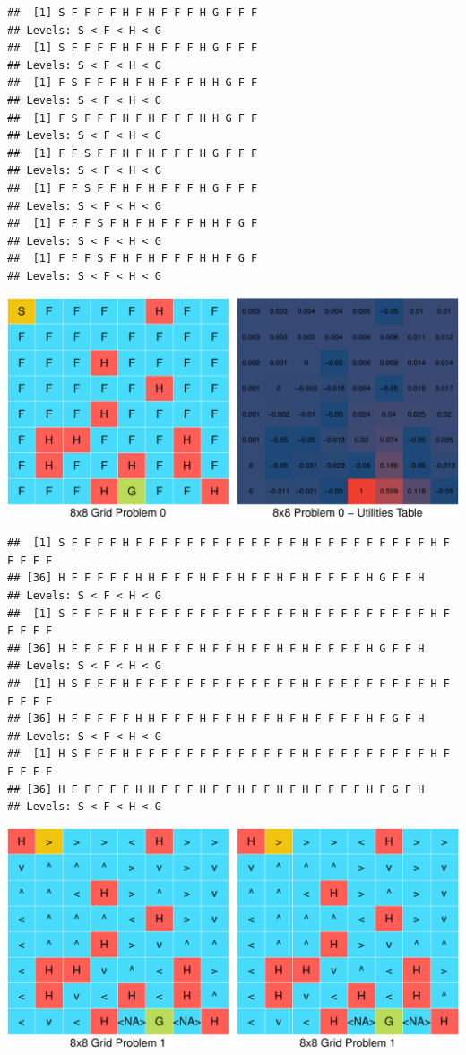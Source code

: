 \documentclass[11pt,]{article}
\begin{document}
\begin{verbatim}
##  [1] S F F F F H F H F F F H G F F F
## Levels: S < F < H < G
##  [1] S F F F F H F H F F F H G F F F
## Levels: S < F < H < G
##  [1] F S F F F H F H F F F H H G F F
## Levels: S < F < H < G
##  [1] F S F F F H F H F F F H H G F F
## Levels: S < F < H < G
##  [1] F F S F F H F H F F F H G F F F
## Levels: S < F < H < G
##  [1] F F S F F H F H F F F H G F F F
## Levels: S < F < H < G
##  [1] F F F S F H F H F F F H H F G F
## Levels: S < F < H < G
##  [1] F F F S F H F H F F F H H F G F
## Levels: S < F < H < G
\end{verbatim}

\begin{center}\includegraphics[width=0.9\linewidth]{project_files/figure-latex/lakes3-1} \end{center}

\begin{verbatim}
##  [1] S F F F F H F F F F F F F F F F F F F H F F F F F F F F F H F F F F F
## [36] H F F F F F H H F F F H F F H F F H F H F F F F H G F F H
## Levels: S < F < H < G
##  [1] S F F F F H F F F F F F F F F F F F F H F F F F F F F F F H F F F F F
## [36] H F F F F F H H F F F H F F H F F H F H F F F F H G F F H
## Levels: S < F < H < G
##  [1] H S F F F H F F F F F F F F F F F F F H F F F F F F F F F H F F F F F
## [36] H F F F F F H H F F F H F F H F F H F H F F F F H F G F H
## Levels: S < F < H < G
##  [1] H S F F F H F F F F F F F F F F F F F H F F F F F F F F F H F F F F F
## [36] H F F F F F H H F F F H F F H F F H F H F F F F H F G F H
## Levels: S < F < H < G
\end{verbatim}

\begin{center}\includegraphics[width=0.9\linewidth]{project_files/figure-latex/lakes3-2} \end{center}
\end{document}
